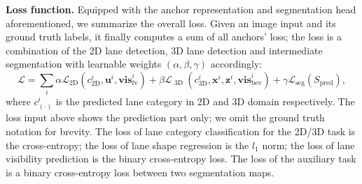 \documentclass[runningheads]{llncs}
\begin{document}
\textbf{Loss function.} 
Equipped with the anchor representation and segmentation head aforementioned, we summarize the overall loss.
Given an image input and its ground truth labels, 
it finally computes a sum of all anchors' loss;
the loss is a combination of the 2D lane detection, 3D lane detection and intermediate segmentation with learnable weights $(\alpha, \beta, \gamma)$ accordingly:
\begin{equation}\label{eqn:total_loss}
\mathcal{L} = 
        \sum_i  
        \alpha \mathcal{L}_{ \text{2D}  }( c^i_{  \text{2D}   }, \mathbf{u}^i, \mathbf{vis}^i_{\text{fv}} ) + \beta 
        \mathcal{L}_{ \text{  3D } } ( c^i_{ \text{3D} }, \mathbf{x}^i, \mathbf{z}^i, \mathbf{vis}^i_{\text{bev}} ) + \gamma \mathcal{L}_{ \text{seg}} (S_{\text{pred}}),
\end{equation}
where $c^i_{( \cdot )} $ is the predicted lane category in 2D and 3D domain respectively. The loss input above shows the prediction part only; we omit the ground truth notation for brevity.
The loss of lane category classification for the 2D/3D task is the cross-entropy; the loss of lane shape regression is the $l_1$ norm; the loss of lane visibility prediction is the binary cross-entropy loss.
The loss of the auxiliary task is a binary cross-entropy loss between two segmentation maps.















 
\end{document}
